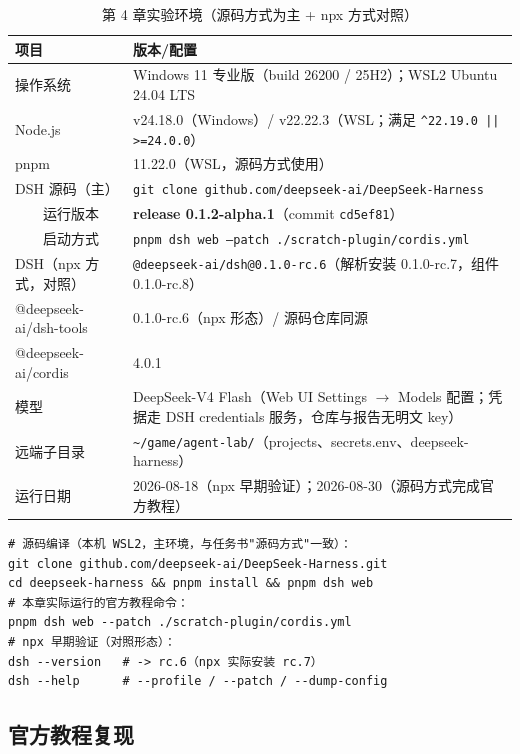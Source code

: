 \begin{table}[H]
\centering
\caption{第 4 章实验环境（源码方式为主 + npx 方式对照）}
\label{tab:ch4_env}
\small
\setlength{\tabcolsep}{4pt}
\begin{tabular}{lp{9cm}}
\toprule
\textbf{项目} & \textbf{版本/配置} \\
\midrule
操作系统 & Windows 11 专业版（build 26200 / 25H2）；WSL2 Ubuntu 24.04 LTS \\
Node.js & v24.18.0（Windows）/ v22.22.3（WSL；满足 \texttt{\^{}22.19.0 || >=24.0.0}） \\
pnpm & 11.22.0（WSL，源码方式使用） \\
DSH 源码（主） & \texttt{git clone github.com/deepseek-ai/DeepSeek-Harness} \\
　　运行版本 & \textbf{release 0.1.2-alpha.1}（commit \texttt{cd5ef81}） \\
　　启动方式 & \texttt{pnpm dsh web --patch ./scratch-plugin/cordis.yml} \\
DSH（npx 方式，对照） & \texttt{@deepseek-ai/dsh@0.1.0-rc.6}（解析安装 0.1.0-rc.7，组件 0.1.0-rc.8） \\
@deepseek-ai/dsh-tools & 0.1.0-rc.6（npx 形态）/ 源码仓库同源 \\
@deepseek-ai/cordis & 4.0.1 \\
模型 & DeepSeek-V4 Flash（Web UI Settings $\rightarrow$ Models 配置；凭据走 DSH credentials 服务，仓库与报告无明文 key） \\
远端子目录 & \nolinkurl{~/game/agent-lab/}（projects、secrets.env、deepseek-harness） \\
运行日期 & 2026-08-18（npx 早期验证）；2026-08-30（源码方式完成官方教程） \\
\bottomrule
\end{tabular}
\end{table}

\begin{verbatim}
# 源码编译（本机 WSL2，主环境，与任务书"源码方式"一致）：
git clone github.com/deepseek-ai/DeepSeek-Harness.git
cd deepseek-harness && pnpm install && pnpm dsh web
# 本章实际运行的官方教程命令：
pnpm dsh web --patch ./scratch-plugin/cordis.yml
# npx 早期验证（对照形态）：
dsh --version   # -> rc.6（npx 实际安装 rc.7）
dsh --help      # --profile / --patch / --dump-config
\end{verbatim}

\subsection{官方教程复现}

